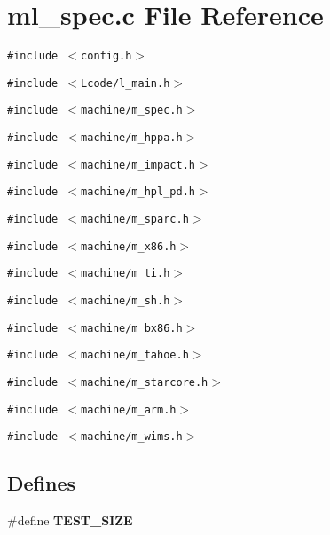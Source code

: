 \section{ml\_\-spec.c File Reference}
\label{ml__spec_8c}
{\tt \#include $<$config.h$>$}\par
{\tt \#include $<$Lcode/l\_\-main.h$>$}\par
{\tt \#include $<$machine/m\_\-spec.h$>$}\par
{\tt \#include $<$machine/m\_\-hppa.h$>$}\par
{\tt \#include $<$machine/m\_\-impact.h$>$}\par
{\tt \#include $<$machine/m\_\-hpl\_\-pd.h$>$}\par
{\tt \#include $<$machine/m\_\-sparc.h$>$}\par
{\tt \#include $<$machine/m\_\-x86.h$>$}\par
{\tt \#include $<$machine/m\_\-ti.h$>$}\par
{\tt \#include $<$machine/m\_\-sh.h$>$}\par
{\tt \#include $<$machine/m\_\-bx86.h$>$}\par
{\tt \#include $<$machine/m\_\-tahoe.h$>$}\par
{\tt \#include $<$machine/m\_\-starcore.h$>$}\par
{\tt \#include $<$machine/m\_\-arm.h$>$}\par
{\tt \#include $<$machine/m\_\-wims.h$>$}\par
\subsection*{Defines}
\begin{CompactItemize}
\item 
\#define \bf{TEST\_\-SIZE}
\end{CompactItemize}
